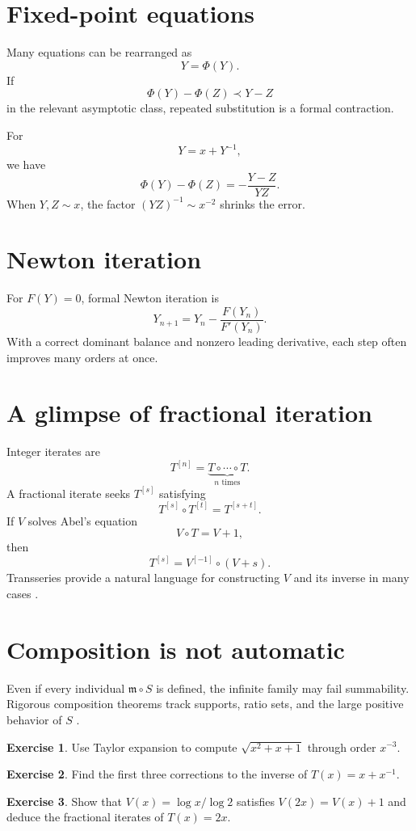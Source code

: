 \documentclass[11pt,oneside,openany]{book}
\newcommand{\mon}{\mathfrak{m}}
\newcommand{\compose}{\mathbin{\circ}}
\theoremstyle{plain}
\theoremstyle{definition}
\newtheorem{exercise}{Exercise}[chapter]
\theoremstyle{remark}
\begin{document}
\section{Fixed-point equations}
Many equations can be rearranged as
\[
  Y=\Phi(Y).
\]
If
\[
  \Phi(Y)-\Phi(Z)\prec Y-Z
\]
in the relevant asymptotic class, repeated substitution is a formal contraction.

For
\[
  Y=x+Y^{-1},
\]
we have
\[
  \Phi(Y)-\Phi(Z)=-\frac{Y-Z}{YZ}.
\]
When $Y,Z\sim x$, the factor $(YZ)^{-1}\sim x^{-2}$ shrinks the error.

\section{Newton iteration}
For $F(Y)=0$, formal Newton iteration is
\[
  Y_{n+1}=Y_n-\frac{F(Y_n)}{F'(Y_n)}.
\]
With a correct dominant balance and nonzero leading derivative, each step often improves many orders at once.

\section{A glimpse of fractional iteration}
Integer iterates are
\[
  T^{[n]}=\underbrace{T\compose\cdots\compose T}_{n\text{ times}}.
\]
A fractional iterate seeks $T^{[s]}$ satisfying
\[
  T^{[s]}\compose T^{[t]}=T^{[s+t]}.
\]
If $V$ solves Abel's equation
\[
  V\compose T=V+1,
\]
then
\[
  T^{[s]}=V^{[-1]}\compose(V+s).
\]
Transseries provide a natural language for constructing $V$ and its inverse in many cases \cite{EdgarComposition,EdgarFractional}.

\section{Composition is not automatic}
Even if every individual $\mon\compose S$ is defined, the infinite family may fail summability. Rigorous composition theorems track supports, ratio sets, and the large positive behavior of $S$ \cite{EdgarComposition}.

\begin{exercise}
Use Taylor expansion to compute $\sqrt{x^2+x+1}$ through order $x^{-3}$.
\end{exercise}

\begin{exercise}
Find the first three corrections to the inverse of $T(x)=x+x^{-1}$.
\end{exercise}

\begin{exercise}
Show that $V(x)=\log x/\log2$ satisfies $V(2x)=V(x)+1$ and deduce the fractional iterates of $T(x)=2x$.
\end{exercise}
\end{document}
